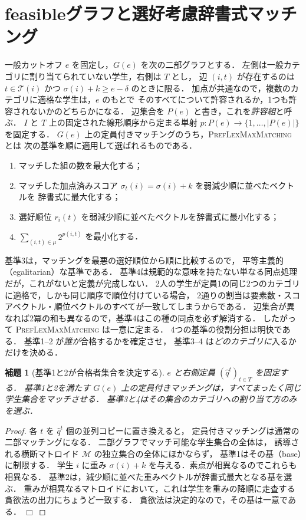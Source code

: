 \documentclass[
    12pt,          %
    a4paper,       %
    oneside,       %
    onecolumn,     %
    titlepage,     %
    final          %
]{jreport} %
\newtheorem{lemma}{補題}[chapter]
\newtheorem{proof}{証明}[chapter]
\newcommand{\qed}{\hfill $\Box$ \par}
\renewcommand{\T}{\mathcal{T}}   %
\begin{document}
\section{feasibleグラフと選好考慮辞書式マッチング}
\label{sec:preflexmax}

一般カットオフ $e$ を固定し，$G(e)$ を次の二部グラフとする．
左側は一般カテゴリに割り当てられていない学生，右側は $T$ とし，
辺 $(i,t)$ が存在するのは $t\in\T(i)$ かつ $\sigma(i)+k\ge e-\delta$ のときに限る．
加点が共通なので，複数のカテゴリに適格な学生は，$e$ のもとで
そのすべてについて許容されるか，1つも許容されないかのどちらかになる．
辺集合を $P(e)$ と書き，これを\emph{許容組}と呼ぶ．
$I$ と $T$ 上の固定された線形順序から定まる単射
$p:P(e)\to\{1,\dots,|P(e)|\}$ を固定する．
$G(e)$ 上の定員付きマッチングのうち，\textsc{PrefLexMaxMatching} とは
次の基準を順に適用して選ばれるものである．
\begin{enumerate}
\item マッチした組の数を最大化する；
\item マッチした加点済みスコア $\sigma_t(i)=\sigma(i)+k$ を弱減少順に並べたベクトルを
      辞書式に最大化する；
\item 選好順位 $r_i(t)$ を弱減少順に並べたベクトルを辞書式に最小化する；
\item $\sum_{(i,t)\in\mu}2^{p(i,t)}$ を最小化する．
\end{enumerate}

基準3は，マッチングを最悪の選好順位から順に比較するので，
平等主義的（egalitarian）な基準である．
基準4は規範的な意味を持たない単なる同点処理だが，これがないと定義が完成しない．
2人の学生が定員1の同じ2つのカテゴリに適格で，しかも同じ順序で順位付けている場合，
2通りの割当は要素数・スコアベクトル・順位ベクトルのすべてが一致してしまうからである．
辺集合が異なれば2冪の和も異なるので，基準4はこの種の同点を必ず解消する．
したがって \textsc{PrefLexMaxMatching} は一意に定まる．
4つの基準の役割分担は明快である．
基準1--2 が\emph{誰が}合格するかを確定させ，
基準3--4 は\emph{どのカテゴリに}入るかだけを決める．

\begin{lemma}[基準1と2が合格者集合を決定する]
\label{lem:matroid}
$e$ と右側定員 $(\hat q^t)_{t\in T}$ を固定する．
基準1と2を満たす $G(e)$ 上の定員付きマッチングは，すべてまったく同じ学生集合をマッチさせる．
基準3と4はその集合のカテゴリへの割り当て方のみを選ぶ．
\end{lemma}

\begin{proof}
各 $t$ を $\hat q^t$ 個の並列コピーに置き換えると，
定員付きマッチングは通常の二部マッチングになる．
二部グラフでマッチ可能な学生集合の全体は，
誘導される横断マトロイド $\mathcal{M}$ の独立集合の全体にほかならず，
基準1はその基（base）に制限する．
学生 $i$ に重み $\sigma(i)+k$ を与える．素点が相異なるのでこれらも相異なる．
基準2は，減少順に並べた重みベクトルが辞書式最大となる基を選ぶ．
重みが相異なるマトロイドにおいて，これは学生を重みの降順に走査する
貪欲法の出力にちょうど一致する．
貪欲法は決定的なので，その基は一意である．
\qed
\end{proof}
\end{document}
